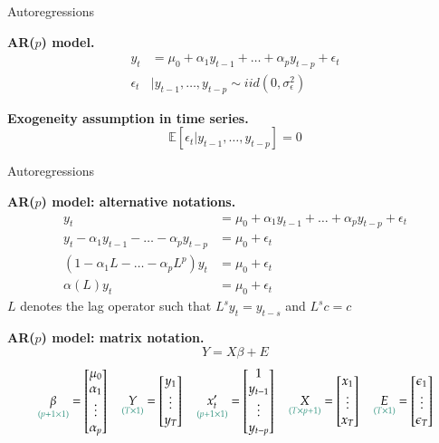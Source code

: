 \documentclass[notes,blackandwhite,mathsans]{beamer}
\begin{document}
\begin{frame}{Autoregressions}

\textbf{AR($p$) model.}
\begin{align*}
y_t &= \mu_0 + \alpha_1y_{t-1} + \dots + \alpha_p y_{t-p} + \epsilon_t  \\
\epsilon_t&|y_{t-1},\dots, y_{t-p} \sim iid(0,\sigma_{\epsilon}^2)
\end{align*}

\bigskip\textbf{Exogeneity assumption in time series.}
$$ \mathbb{E}[\epsilon_t|y_{t-1},\dots, y_{t-p}] = 0 $$


\end{frame}


\begin{frame}{Autoregressions}

\textbf{AR($p$) model: alternative notations.}
\begin{align*}
y_t &= \mu_0 + \alpha_1y_{t-1} + \dots + \alpha_p y_{t-p} + \epsilon_t  \\
y_t - \alpha_1y_{t-1} - \dots - \alpha_p y_{t-p} &= \mu_0  + \epsilon_t  \\
\left( 1- \alpha_1L - \dots -\alpha_pL^p \right)y_t &= \mu_0 + \epsilon_t\\
\alpha(L) y_t &= \mu_0 + \epsilon_t
\end{align*}
$L$ {\color{mcxs2}denotes the lag operator such that} $L^sy_t=y_{t-s}$ {\color{mcxs2}and} $L^sc=c$

\bigskip\textbf{AR($p$) model: matrix notation.}
$$Y = X \beta + E  $$\footnotesize
$$ \underset{\color{mcxs2}(p+1\times1)}{\beta} = \begin{bmatrix} \mu_0\\ \alpha_1\\ \vdots \\ \alpha_p \end{bmatrix} \quad \underset{\color{mcxs2}(T\times1)}{Y} = \begin{bmatrix} y_1\\ \vdots \\ y_T \end{bmatrix} \quad \underset{\color{mcxs2}(p+1\times1)}{x_t'} = \begin{bmatrix} 1\\ y_{t-1}\\ \vdots \\ y_{t-p} \end{bmatrix} \quad \underset{\color{mcxs2}(T\times p+1)}{X} = \begin{bmatrix} x_1\\ \vdots \\ x_T \end{bmatrix}\quad \underset{\color{mcxs2}(T\times1)}{E} = \begin{bmatrix} \epsilon_1\\ \vdots \\ \epsilon_T \end{bmatrix}$$

\end{frame}
\end{document}
